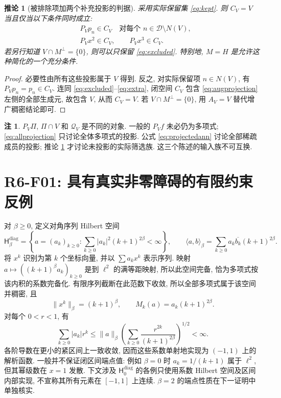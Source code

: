 \documentclass[UTF8,11pt]{ctexart}
\newtheorem{corollary}[theorem]{推论}
\theoremstyle{definition}
\newtheorem{remark}[theorem]{注}
\newcommand{\D}{\mathcal D}
\newcommand{\Q}{\mathcal Q}
\newcommand{\Hd}[1]{\mathsf H_{#1}^{\mathrm{diag}}}
\begin{document}
\begin{corollary}[被排除项加两个补充投影的判据]\label{cor:excluded}
采用实际保留集 \eqref{eq:kept}. 则 $C_V=V$ 当且仅当以下条件同时成立:
\begin{align}
 &P_Vp_n\in C_V\quad\text{对每个 }n\in\D\setminus N(V),\label{eq:excluded}\\
 &P_Vx^2\in C_V,\qquad P_Vx^3\in C_V.\label{eq:extra}
\end{align}
若另行知道 $V\cap M^\perp=\{0\}$, 则可以只保留 \eqref{eq:excluded}.
特别地, $M=H$ 是允许这种简化的一个充分条件.
\end{corollary}
\begin{proof}
必要性由所有这些投影属于 $V$ 得到.
反之, 对实际保留项 $n\in N(V)$, 有 $P_Vp_n=p_n\in C_V$.
连同 \eqref{eq:excluded}--\eqref{eq:extra}, 闭空间 $C_V$ 包含
\eqref{eq:augprojection} 左侧的全部生成元, 故包含 $V$, 从而 $C_V=V$.
若 $V\cap M^\perp=\{0\}$, 用 $A_V=V$ 替代增广稠密结论即可.
\end{proof}

\begin{remark}
$P_V\Pi$, $\Pi\cap V$ 和 $\Q_V$ 是不同的对象.
一般的 $P_Vf$ 未必仍为多项式; \eqref{eq:allprojection} 只讨论全体多项式的投影.
公式 \eqref{eq:projectedann} 讨论全部稀疏成员的投影;
推论 \ref{cor:excluded} 才讨论未投影的实际筛选族.
这三个陈述的输入族不可互换.
\end{remark}

\section{R6-F01: 具有真实非零障碍的有限约束反例}\label{sec:counterexample}

对 $\beta\geq0$, 定义对角序列 Hilbert 空间
\[
 \Hd\beta=\left\{a=(a_k)_{k\geq0}:\sum_{k\geq0}|a_k|^2(k+1)^{2\beta}<\infty\right\},
 \qquad \langle a,b\rangle_\beta=\sum_{k\geq0}a_k\overline{b_k}(k+1)^{2\beta}.
\]
将 $x^k$ 识别为第 $k$ 个坐标向量, 并以 $\sum a_kx^k$ 表示序列.
映射 $a\mapsto((k+1)^\beta a_k)_{k\geq0}$ 是到 $\ell^2$ 的满等距映射,
所以此空间完备, 恰为多项式按该内积的系数完备化.
有限序列截断在此范数下收敛, 所以全部多项式属于该空间并稠密, 且
\begin{equation}\label{eq:diagmoment}
 \|x^k\|_\beta=(k+1)^\beta,\qquad M_k(a)=a_k(k+1)^{2\beta}.
\end{equation}
对每个 $0<r<1$, 有
\[
 \sum_{k\geq0}|a_k|r^k\leq\|a\|_\beta
 \left(\sum_{k\geq0}\frac{r^{2k}}{(k+1)^{2\beta}}\right)^{1/2}<\infty.
\]
各阶导数在更小的紧区间上一致收敛, 因而这些系数单射地实现为 $(-1,1)$ 上的
解析函数. 一般并不保证闭区间端点值: 例如 $\beta=0$ 时
$a_k=1/(k+1)$ 属于 $\ell^2$, 但其幂级数在 $x=1$ 发散.
下文涉及 $\Hd0$ 的各例只使用系数 Hilbert 空间及区间内部实现,
不宣称其所有元素在 $[-1,1]$ 上连续. $\beta=2$ 的端点性质在下一证明中单独核实.
\end{document}
